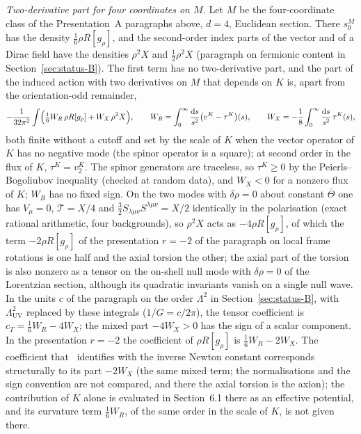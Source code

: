 \emph{Two-derivative part for four coordinates on \(M\).} Let \(M\) be the four-coordinate class of the Presentation~A paragraphs above, \(d=4\), Euclidean section. There \(s_0^M\) has the density \(\tfrac16\rho R[g_\rho]\), and the second-order index parts of the vector and of a Dirac field have the densities \(\rho^2X\) and \(\tfrac12\rho^2X\) (paragraph on fermionic content in Section~\ref{sec:status-B}). The first term has no two-derivative part, and the part of the induced action with two derivatives on \(M\) that depends on \(K\) is, apart from the orientation-odd remainder,
\[
  -\frac1{32\pi^2}\int\Bigl(\tfrac16W_R\,\rho R[g_\rho]+W_X\,\rho^2X\Bigr),\qquad
  W_R=\int_0^\infty\frac{\mathrm ds}{s^2}\bigl(v^K-\tau^K\bigr)(s),\qquad
  W_X=-\frac18\int_0^\infty\frac{\mathrm ds}{s^2}\,\tau^K(s),
\]
both finite without a cutoff and set by the scale of \(K\) when the vector operator of \(K\) has no negative mode (the spinor operator is a square); at second order in the flux of \(K\), \(\tau^K=v_2^K\). The spinor generators are traceless, so \(\tau^K\ge0\) by the Peierls--Bogoliubov inequality (checked at random data), and \(W_X<0\) for a nonzero flux of \(K\); \(W_R\) has no fixed sign. On the two modes with \(\delta\rho=0\) about constant \(\bar\Theta\) one has \(V_\mu=0\), \(\mathcal T=X/4\) and \(\tfrac32S_{\lambda\mu\nu}S^{\lambda\mu\nu}=X/2\) identically in the polarisation (exact rational arithmetic, four backgrounds), so \(\rho^2X\) acts as \(-4\rho R[g_\rho]\), of which the term \(-2\rho R[g_\rho]\) of the presentation \(r=-2\) of the paragraph on local frame rotations is one half and the axial torsion the other; the axial part of the torsion is also nonzero as a tensor on the on-shell null mode with \(\delta\rho=0\) of the Lorentzian section, although its quadratic invariants vanish on a single null wave. In the units \(c\) of the paragraph on the order \(\Lambda^2\) in Section~\ref{sec:status-B}, with \(\Lambda_{\mathrm{UV}}^2\) replaced by these integrals (\(1/G=c/2\pi\)), the tensor coefficient is \(c_T=\tfrac16W_R-4W_X\); the mixed part \(-4W_X>0\) has the sign of a scalar component. In the presentation \(r=-2\) the coefficient of \(\rho R[g_\rho]\) is \(\tfrac16W_R-2W_X\). The coefficient that~\cite{Steinacker2023} identifies with the inverse Newton constant corresponds structurally to its part \(-2W_X\) (the same mixed term; the normalisations and the sign convention are not compared, and there the axial torsion is the axion); the contribution of \(K\) alone is evaluated in Section~6.1 there as an effective potential, and its curvature term \(\tfrac16W_R\), of the same order in the scale of \(K\), is not given there.

